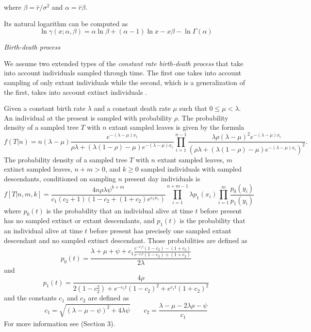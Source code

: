 \documentclass{llncs}
\renewcommand{\subsection}[1]{%
\bigskip
\begin{center}
\begin{large}
\normalfont\itshape #1
\end{large}
\end{center}}
\begin{document}
where $\beta = \bar{r} / \sigma^2$ and $\alpha = \bar{r} \beta$.

Its natural logarithm can be computed as
$$ \ln \gamma(x;\alpha,\beta) = \alpha\ln\beta + (\alpha-1)\ln x -x\beta - \ln\Gamma(\alpha) $$

\subsection{Birth-death process}

We assume two extended types of the {\em constant rate birth-death process}
\cite{Kendall1948} that take into account individuals sampled through time. The
first one takes into account sampling of only extant individuals
\cite{Stadler2009} while the second, which is a generalization of the first,
takes into account extinct individuals \cite{Stadler2010}.

Given a constant birth rate $\lambda$ and a constant death rate $\mu$ such that
$0 \leq \mu < \lambda$. An individual at the present is sampled with
probability $\rho$.  The probability density of a sampled tree $T$ with $n$
extant sampled leaves is given by the formula
%
%
$$f(T|n) = n(\lambda-\mu)\frac{e^{-(\lambda-\mu)x_1}}{\rho\lambda + (\lambda(1 -\rho)-\mu)e^{-(\lambda-\mu)x_1}}\prod_{i=1}^{n-1}
\frac{\lambda\rho(\lambda-\mu)^2e^{-(\lambda-\mu)x_i}}{(\rho\lambda + (\lambda(1-\rho)-\mu)e^{-(\lambda-\mu)x_i})^2}.$$
%
%
The probability density of a sampled tree $T$ with $n$ extant sampled leaves,
$m$ extinct sampled leaves, $n+m > 0$, and $k \geq 0$ sampled individuals with
sampled descendants, conditioned on sampling $n$ present day individuals is
%
%
$$f[T|n,m,k] = \frac{4n\rho\lambda\psi^{k+m}}{c_1(c_2+1)(1-c_2+(1+c_2)e^{c_1x_1})}\prod_{i=1}^{n+m-1}\lambda p_1(x_i)\prod_{i=1}^{m}\frac{p_0(y_i)}{p_1(y_i)}$$
%
%
where $p_0(t)$ is the probability that an individual alive at time $t$ before
present has no sampled extinct or extant descendants, and $p_1(t)$ is the
probability that an individual alive at time $t$ before present has precisely
one sampled extant descendant and no sampled extinct descendant. Those probabilities
are defined as
%
$$p_0(t) = \frac{\lambda+\mu+\psi+c_1\frac{e^{-c_1 t}(1-c_2)-(1+c_2)}{e^{-c_1t}(1-c_2)+(1+c_2)}}{2\lambda}$$
and
$$p_1(t) = \frac{4\rho}{2(1-c_2^2)+e^{-c_1t}(1-c_2)^2+e^{c_1t}(1+c_2)^2}$$
%
and the constants $c_1$ and $c_2$ are defined as
%
$$c_1 = \sqrt{(\lambda-\mu-\psi)^2 + 4\lambda\psi} \qquad c_2 = \frac{\lambda-\mu-2\lambda\rho-\psi}{c_1}$$
%
For more information see \cite{Stadler2010} (Section 3).
\end{document}
